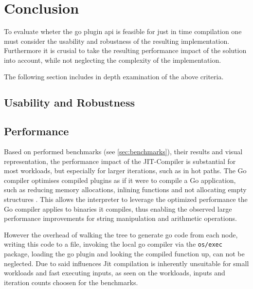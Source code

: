 \chapter{Conclusion}

To evaluate wheter the go plugin api is feasible for just in time compilation
one must consider the usability and robustness of the resulting implementation.
Furthermore it is crusial to take the resulting performance impact of the
solution into account, while not neglecting the complexity of the
implementation.

The following section includes in depth examination of the above criteria.

\section{Usability and Robustness}


\section{Performance}

Based on performed benchmarks (see \autoref{sec:benchmarks}), their results and
visual representation, the performance impact of the JIT-Compiler is
substantial for most workloads, but especially for larger iterations, such as
in hot paths. The Go compiler optimises compiled plugins as if it were to
compile a Go application, such as reducing memory allocations\cite[Escape
Analysis]{go_wiki_optimization}, inlining
functions\cite[Inlining]{go_wiki_optimization} and not allocating empty
structures \cite[Interface Values]{go_wiki_optimization}. This allows the
interpreter to leverage the optimized performance the Go compiler applies to
binaries it compiles, thus enabling the observed large performance improvements
for string manipulation and arithmetic operations.

However the overhead of walking the tree to generate go code from each node,
writing this code to a file, invoking the local go compiler via the
\texttt{os/exec} package, loading the go plugin and looking the compiled
function up, can not be neglected. Due to said influences Jit compilation
is inherently unsuitable for small workloads and fast executing inputs, as seen
on the workloads, inputs and iteration counts choosen for the benchmarks. 

